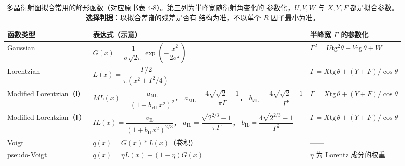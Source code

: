 \begin{table}[tbp]
  \centering
  \caption{多晶衍射图拟合常用的峰形函数（对应原书表 4-8）。第三列为半峰宽随衍射角变化的
    参数化，$U,V,W$ 与 $X,Y,F$ 都是拟合参数。\textbf{选择判据}：以拟合差谱的残差是否有
    结构为准，不以单个 $R$ 因子最小为准。}
  \label{tab:ch04c-profile}
  \begin{tabularx}{\columnwidth}{@{}lXX@{}}
    \toprule
    函数类型 & 表达式（示意） & 半峰宽 $\Gamma$ 的参数化 \\
    \midrule
    Gaussian & $G(x)=\dfrac{1}{\sigma\sqrt{2\pi}}\exp\!\left(-\dfrac{x^{2}}{2\sigma^{2}}\right)$
      & $\Gamma^{2}=U\mathrm{tg}^{2}\theta+V\mathrm{tg}\,\theta+W$ \\
    Lorentzian & $L(x)=\dfrac{\Gamma/2}{\pi\left(x^{2}+\Gamma^{2}/4\right)}$
      & $\Gamma=X\mathrm{tg}\,\theta+(Y+F)/\cos\theta$ \\
    Modified Lorentzian（Ⅰ） & $ML(x)=\dfrac{a_{\mathrm{ML}}}{\left(1+b_{\mathrm{ML}}x^{2}\right)^{2}}$，
      $a_{\mathrm{ML}}=\dfrac{4\sqrt{\sqrt{2}-1}}{\pi\Gamma}$，
      $b_{\mathrm{ML}}=\dfrac{4\sqrt{\sqrt{2}-1}}{\Gamma^{2}}$
      & $\Gamma=X\mathrm{tg}\,\theta+(Y+F)/\cos\theta$ \\
    Modified Lorentzian（Ⅱ） & $IL(x)=\dfrac{a_{\mathrm{IL}}}{\left(1+b_{\mathrm{IL}}x^{2}\right)^{2/3}}$，
      $a_{\mathrm{IL}}=\dfrac{\sqrt{2^{2/3}-1}}{\pi\Gamma}$，
      $b_{\mathrm{IL}}=\dfrac{4\sqrt{2^{2/3}-1}}{\Gamma^{2}}$
      & $\Gamma=X\mathrm{tg}\,\theta+(Y+F)/\cos\theta$ \\
    Voigt & $q(x)=G(x)*L(x)$（卷积） & —— \\
    pseudo-Voigt & $q(x)=\eta L(x)+(1-\eta)G(x)$ & $\eta$ 为 Lorentz 成分的权重 \\
    \bottomrule
  \end{tabularx}
\end{table}

